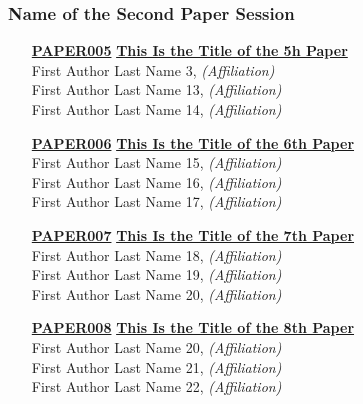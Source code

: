 \subsubsection{Name of the Second Paper Session}
\begin{enumerate}
\item[\href{https://doi.org/10.1145/1122445.1122456}{\textbf{PAPER005}}]
\href{https://doi.org/10.1145/1122445.1122456}{\textbf{This Is the Title of the 5h Paper}}\\
First Author Last Name 3, \emph{(Affiliation)}\\
First Author Last Name 13, \emph{(Affiliation)}\\
First Author Last Name 14, \emph{(Affiliation)}\\

\item[\href{https://doi.org/10.1145/1122445.1122456}{\textbf{PAPER006}}]
\href{https://doi.org/10.1145/1122445.1122456}{\textbf{This Is the Title of the 6th Paper}}\\
First Author Last Name 15, \emph{(Affiliation)}\\
First Author Last Name 16, \emph{(Affiliation)}\\
First Author Last Name 17, \emph{(Affiliation)}\\

\item[\href{https://doi.org/10.1145/1122445.1122456}{\textbf{PAPER007}}]
\href{https://doi.org/10.1145/1122445.1122456}{\textbf{This Is the Title of the 7th Paper}}\\
First Author Last Name 18, \emph{(Affiliation)}\\
First Author Last Name 19, \emph{(Affiliation)}\\
First Author Last Name 20, \emph{(Affiliation)}\\

\item[\href{https://doi.org/10.1145/1122445.1122456}{\textbf{PAPER008}}]
\href{https://doi.org/10.1145/1122445.1122456}{\textbf{This Is the Title of the 8th Paper}}\\
First Author Last Name 20, \emph{(Affiliation)}\\
First Author Last Name 21, \emph{(Affiliation)}\\
First Author Last Name 22, \emph{(Affiliation)}\\
\end{enumerate}


